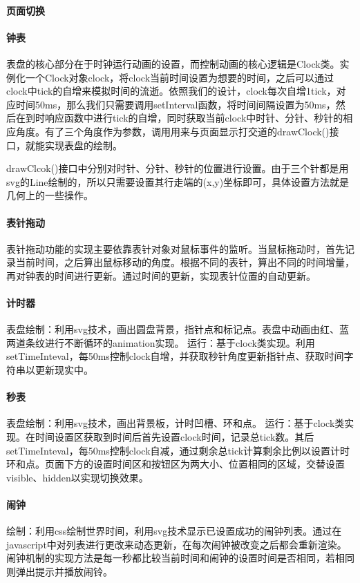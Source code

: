 \documentclass[UTF8]{ctexart}
\begin{document}
	\paragraph{页面切换}
	
	\paragraph{钟表}
	表盘的核心部分在于时钟运行动画的设置，而控制动画的核心逻辑是Clock类。实例化一个Clock对象clock，将clock当前时间设置为想要的时间，之后可以通过clock中tick的自增来模拟时间的流逝。依照我们的设计，clock每次自增1tick，对应时间50ms，那么我们只需要调用setInterval函数，将时间间隔设置为50ms，然后在到时响应函数中进行tick的自增，同时获取当前clock中时针、分针、秒针的相应角度。有了三个角度作为参数，调用用来与页面显示打交道的drawClock()接口，就能实现表盘的绘制。
	
	drawClcok()接口中分别对时针、分针、秒针的位置进行设置。由于三个针都是用svg的Line绘制的，所以只需要设置其行走端的(x,y)坐标即可，具体设置方法就是几何上的一些操作。
	
	\paragraph{表针拖动}
	表针拖动功能的实现主要依靠表针对象对鼠标事件的监听。当鼠标拖动时，首先记录当前时间，之后算出鼠标移动的角度。根据不同的表针，算出不同的时间增量，再对钟表的时间进行更新。通过时间的更新，实现表针位置的自动更新。
	
	\paragraph{计时器}
	表盘绘制：利用svg技术，画出圆盘背景，指针点和标记点。表盘中动画由红、蓝两道条纹进行不断循环的animation实现。
	运行：基于clock类实现。利用setTimeInteval，每50ms控制clock自增，并获取秒针角度更新指针点、获取时间字符串以更新现实中。
	\paragraph{秒表}
	表盘绘制：利用svg技术，画出背景板，计时凹槽、环和点。
	运行：基于clock类实现。在时间设置区获取到时间后首先设置clock时间，记录总tick数。其后setTimeInteval，每50ms控制clock自减，通过剩余总tick计算剩余比例以设置计时环和点。页面下方的设置时间区和按钮区为两大小、位置相同的区域，交替设置visible、hidden以实现切换效果。
	\paragraph{闹钟}
	绘制：利用css绘制世界时间，利用svg技术显示已设置成功的闹钟列表。通过在javascript中对列表进行更改来动态更新，在每次闹钟被改变之后都会重新渲染。闹钟机制的实现方法是每一秒都比较当前时间和闹钟的设置时间是否相同，若相同则弹出提示并播放闹铃。
	
\end{document}
